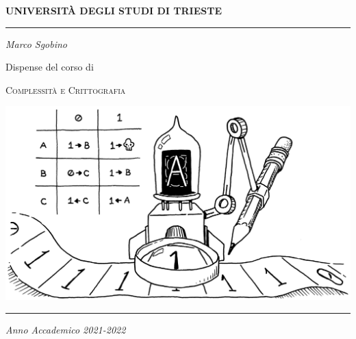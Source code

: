 \begin{titlepage}
        \begin{center}
                \Large
                \textbf{UNIVERSITÀ DEGLI STUDI DI TRIESTE}

                \par\noindent\rule{\textwidth}{0.8pt}
                \vspace*{0.6cm}

                \large
                \emph{Marco Sgobino}

                \large
                \vspace*{0.6cm}

                \Large Dispense del corso di
                \vspace*{0.6cm}

                \Huge
                \textsc{Complessità e Crittografia}
                \vspace*{.1cm}


                \vspace*{2cm}

                \begin{center}
                        \includegraphics[width=.9\textwidth, keepaspectratio]{./pics/turing-machine-titlepage.png}
                \end{center}

                \vfill

                \par\noindent\rule{\textwidth}{0.8pt}
                \vspace*{0.6cm}
                \large
                \emph{Anno Accademico 2021-2022}

                \newpage


\end{center}
\end{titlepage}
